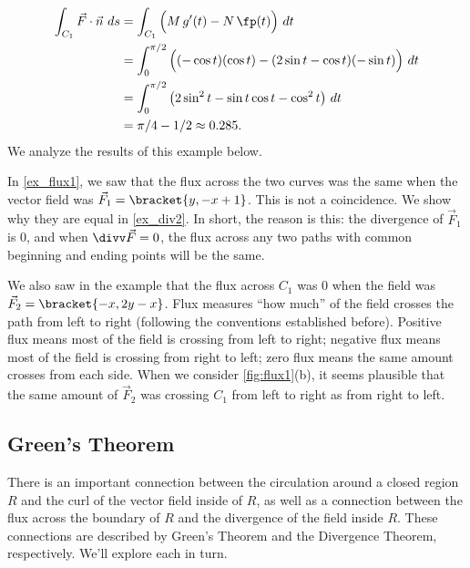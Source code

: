 \begin{example}
\begin{align*}
	\int_{C_1} \vec F\cdot \vec n\ ds
	& = \int_{C_1} \Big(M\,g'(t) - N\,\fp(t)\Big)\ dt\\
	&= \int_0^{\pi/2}\Big((-\cos t)(\cos t) - (2\sin t-\cos t)(-\sin t)\Big)\ dt\\
	&= \int_0^{\pi/2} \big(2\sin^2 t-\sin t\cos t-\cos^2t\big)\ dt\\
	&=\pi/4 - 1/2\approx 0.285.
\end{align*}
We analyze the results of this example below.
\end{example}

In \autoref{ex_flux1}, we saw that the flux across the two curves was the same when the vector field was $\vec F_1 =\bracket{y, -x+1}$. This is not a coincidence. We show why they are equal in \autoref{ex_div2}. In short, the reason is this: the divergence of $\vec F_1$ is 0, and when $\divv \vec F = 0$, the flux across any two paths with common beginning and ending points will be the same.

We also saw in the example that the flux across $C_1$ was 0 when the field was $\vec F_2 =\bracket{-x, 2y-x}$. Flux measures ``how much'' of the field crosses the path from left to right (following the conventions established before). Positive flux means most of the field is crossing from left to right; negative flux means most of the field is crossing from right to left; zero flux means the same amount crosses from each side. When we consider \autoref{fig:flux1}(b), it seems plausible that the same amount of $\vec F_2$ was crossing $C_1$ from left to right as from right to left.

%

\subsection{Green's Theorem}

There is an important connection between the circulation around a closed region $R$ and the curl of the vector field inside of $R$, as well as a connection between the flux across the boundary of $R$ and the divergence of the field inside $R$. These connections are described by Green's Theorem and the Divergence Theorem, respectively. We'll explore each in turn.

